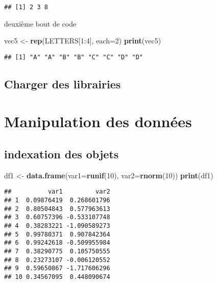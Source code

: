\documentclass[french,]{article}
\newenvironment{Shaded}{\begin{snugshade}}{\end{snugshade}}
\newcommand{\KeywordTok}[1]{\textcolor[rgb]{0.13,0.29,0.53}{\textbf{{#1}}}}
\newcommand{\DataTypeTok}[1]{\textcolor[rgb]{0.13,0.29,0.53}{{#1}}}
\newcommand{\DecValTok}[1]{\textcolor[rgb]{0.00,0.00,0.81}{{#1}}}
\newcommand{\StringTok}[1]{\textcolor[rgb]{0.31,0.60,0.02}{{#1}}}
\newcommand{\NormalTok}[1]{{#1}}
\begin{document}
\begin{verbatim}
## [1] 2 3 8
\end{verbatim}

deuxième bout de code

\begin{Shaded}
\begin{Highlighting}[]
\NormalTok{vec5 <-}\StringTok{ }\KeywordTok{rep}\NormalTok{(LETTERS[}\DecValTok{1}\NormalTok{:}\DecValTok{4}\NormalTok{], }\DataTypeTok{each=}\DecValTok{2}\NormalTok{)}
\KeywordTok{print}\NormalTok{(vec5)}
\end{Highlighting}
\end{Shaded}

\begin{verbatim}
## [1] "A" "A" "B" "B" "C" "C" "D" "D"
\end{verbatim}

\subsection{Charger des librairies}\label{charger-des-librairies}

\newpage

\section{Manipulation des données}\label{manipulation-des-donnees}

\subsection{indexation des objets}\label{indexation-des-objets}

\begin{Shaded}
\begin{Highlighting}[]
\NormalTok{df1 <-}\StringTok{ }\KeywordTok{data.frame}\NormalTok{(}\DataTypeTok{var1=}\KeywordTok{runif}\NormalTok{(}\DecValTok{10}\NormalTok{), }\DataTypeTok{var2=}\KeywordTok{rnorm}\NormalTok{(}\DecValTok{10}\NormalTok{))}
\KeywordTok{print}\NormalTok{(df1)}
\end{Highlighting}
\end{Shaded}

\begin{verbatim}
##          var1         var2
## 1  0.09876419  0.268601796
## 2  0.80504843  0.577963613
## 3  0.60757396 -0.533107748
## 4  0.38283221 -1.090589273
## 5  0.99780371  0.907842364
## 6  0.99242618 -0.509955984
## 7  0.38290775  0.105750555
## 8  0.23273107 -0.006120552
## 9  0.59650867 -1.717606296
## 10 0.34567095  0.448090674
\end{verbatim}
\end{document}

